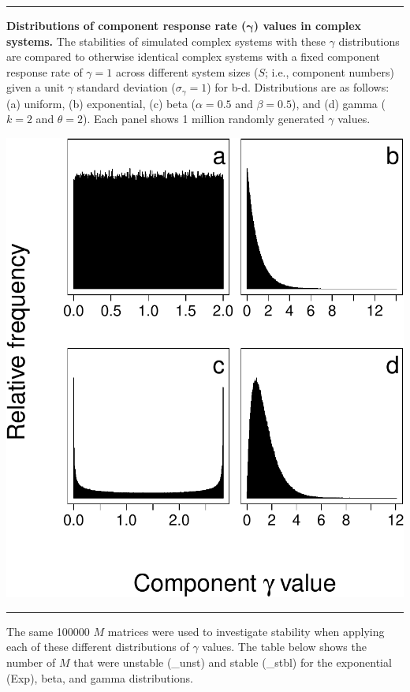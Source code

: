 \documentclass[]{article}
\begin{document}
\begin{center}\rule{0.5\linewidth}{\linethickness}\end{center}

\textbf{Distributions of component response rate
(\(\boldsymbol{\gamma}\)) values in complex systems.} The stabilities of
simulated complex systems with these \(\gamma\) distributions are
compared to otherwise identical complex systems with a fixed component
response rate of \(\gamma = 1\) across different system sizes (\(S\);
i.e., component numbers) given a unit \(\gamma\) standard deviation
(\(\sigma_{\gamma} = 1\)) for b-d. Distributions are as follows: (a)
uniform, (b) exponential, (c) beta (\(\alpha = 0.5\) and
\(\beta = 0.5\)), and (d) gamma (\(k = 2\) and \(\theta = 2\)). Each
panel shows 1 million randomly generated \(\gamma\) values.

\includegraphics{SI_files/figure-latex/unnamed-chunk-23-1.pdf}

\begin{center}\rule{0.5\linewidth}{\linethickness}\end{center}

The same 100000 \(M\) matrices were used to investigate stability when
applying each of these different distributions of \(\gamma\) values. The
table below shows the number of \(M\) that were unstable (\_unst) and
stable (\_stbl) for the exponential (Exp), beta, and gamma
distributions.
\end{document}
